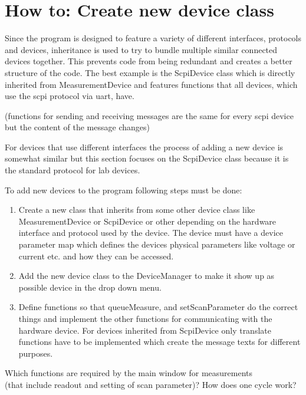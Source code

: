 \newpage
\section{How to: Create new device class}
Since the program is designed to feature a variety of different interfaces, protocols and devices, inheritance is used to try to bundle multiple similar connected devices together. This prevents code from being redundant and creates a better structure of the code. The best example is the ScpiDevice class which is directly inherited from MeasurementDevice and features functions that all devices, which use the scpi protocol via uart, have.

(functions for sending and receiving messages are the same for every scpi device but the content of the message changes)\par\bigskip
For devices that use different interfaces the process of adding a new device is somewhat similar but this section focuses on the ScpiDevice class because it is the standard protocol for lab devices.\par\bigskip
To add new devices to the program following steps must be done:
\begin{enumerate}
	\item Create a new class that inherits from some other device class like MeasurementDevice or ScpiDevice or other depending on the hardware interface and protocol used by the device. The device must have a device parameter map which defines the devices physical parameters like voltage or current etc. and how they can be accessed.
	\item Add the new device class to the DeviceManager to make it show up as possible device in the drop down menu.
	\item Define functions so that queueMeasure, and setScanParameter do the correct things and implement the other functions for communicating with the hardware device. For devices inherited from ScpiDevice only translate functions have to be implemented which create the message texts for different purposes.
\end{enumerate}
\par\bigskip
Which functions are required by the main window for measurements \\(that include readout and setting of scan parameter)?
How does one cycle work?
